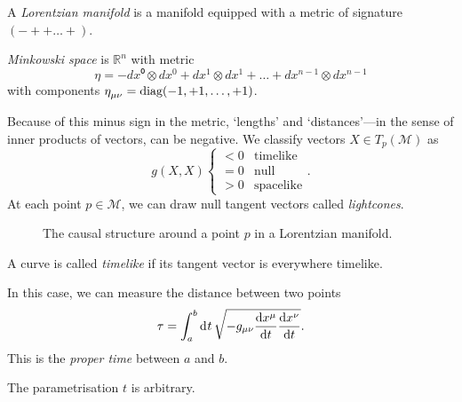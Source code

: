 \begin{definition}
  A \emph{Lorentzian manifold} is a manifold equipped with a metric of signature $(- + + \dots +)$.
\end{definition}
\begin{example}[]
  \emph{Minkowski space} is $\mathbb{R}^n$ with metric
  \begin{equation}
    \eta = -dx⁰ \otimes dx^0 + dx^1 \otimes dx^1 + \dots + dx^{n-1} \otimes dx^{n-1}
  \end{equation}
  with components $\eta\indices{_\mu_\nu} = \text{diag}(-1, +1, \dots, +1)$.
\end{example}
Because of this minus sign in the metric, `lengths' and `distances'---in the sense of inner products of vectors, can be negative.
We classify vectors $X \in T_p(\mathcal{M})$ as
\begin{equation}
  g(X, X) 
  \begin{cases}
    < 0 & \text{timelike} \\
    = 0 & \text{null} \\
    > 0 & \text{spacelike}
  \end{cases}.
\end{equation}
At each point $p \in \mathcal{M}$, we can draw null tangent vectors called \emph{lightcones}.
\begin{figure}[tbhp]
  \centering
  \def\svgwidth{0.2\columnwidth}
  
  \caption{The causal structure around a point $p$ in a Lorentzian manifold.}
  \label{fig:causal-structure-M4}
\end{figure}
\begin{definition}[]
  A curve is called \emph{timelike} if its tangent vector is everywhere timelike.
\end{definition}

\begin{definition}
  In this case, we can measure the distance between two points
  \begin{equation}
    \tau = \int_{a}^{b} \dd[]{t} \sqrt{-g_{\mu\nu} \dv{x^\mu}{t} \dv{x^\nu}{t}}.
  \end{equation}
  This is the \emph{proper time} between $a$ and $b$.
\end{definition}
\begin{leftbar}
  \begin{remark}
    The parametrisation $t$ is arbitrary.
  \end{remark}
\end{leftbar}

